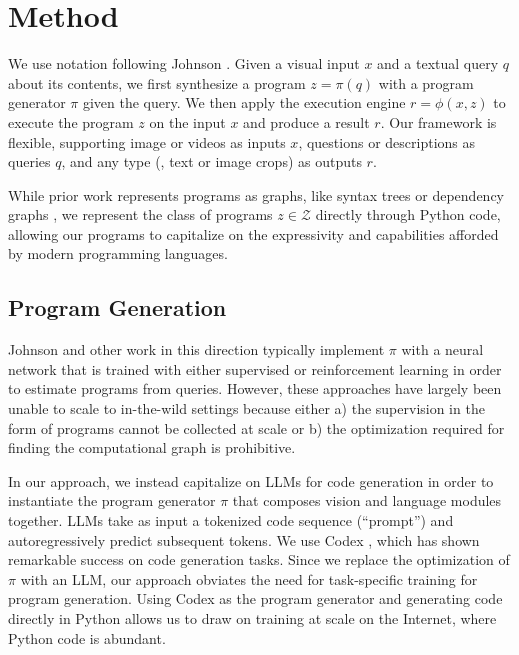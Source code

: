 \documentclass[10pt,twocolumn,letterpaper]{article}
\begin{document}
\section{Method}\label{sec:method}
We use notation following Johnson \etal\cite{johnson_inferring_2017}.
Given a visual input $x$ and a textual query $q$ about its contents, we first synthesize a program $z = \pi(q)$ with a program generator $\pi$ given the query. We then apply the execution engine $r = \phi(x,z)$ to execute the program $z$ on the input $x$ and produce a result $r$. Our framework is flexible, supporting image or videos as inputs $x$, questions or descriptions as queries $q$, and any type (\eg, text or image crops) as outputs $r$. 

While prior work represents programs as graphs, like syntax trees \cite{johnson_inferring_2017} or dependency graphs \cite{cao_interpretable_2021}, we represent the class of programs $z \in \mathcal{Z}$ directly through Python code, allowing our programs to capitalize on the expressivity and capabilities afforded by modern programming languages.

\subsection{Program Generation}

Johnson \etal\cite{johnson_inferring_2017} and other work in this direction \cite{hu_learning_2017,yi_neural-symbolic_2018,hudson_compositional_2018} typically implement $\pi$ with a neural network that is trained with either supervised or reinforcement learning in order to estimate programs from queries. However, these approaches have largely been unable to scale to in-the-wild settings because either a) the supervision in the form of programs cannot be collected at scale or b) the optimization required for finding the computational graph is prohibitive.

In our approach, we instead capitalize on LLMs for code generation in order to instantiate the program generator $\pi$ that composes vision and language modules together. 
LLMs take as input a tokenized code sequence (``prompt'') and autoregressively predict subsequent tokens. We use Codex \cite{chen2021evaluating}, which has shown remarkable success on code generation tasks. Since we replace the optimization of $\pi$ with an LLM, our approach 
obviates the need for task-specific training for program generation. Using Codex as the program generator and generating code directly in Python allows us to draw on training at scale on the Internet, where Python code is abundant.
\end{document}
